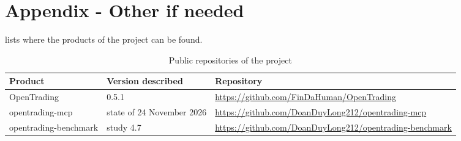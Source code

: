 \section{Appendix - Other if needed}\label{sec:app-other}
 lists where the products of the project can be found.

\begin{table}[H]
  \centering
  \caption{Public repositories of the project}\label{tab:repositories}
  \begin{tabularx}{\textwidth}{@{}l l L@{}}
    \toprule
    {Product} & {Version described} & {Repository}\\
    \midrule
    OpenTrading & 0.5.1 & \url{https://github.com/FinDaHuman/OpenTrading}\\
    opentrading-mcp & state of 24 November 2026 & \url{https://github.com/DoanDuyLong212/opentrading-mcp}\\
    opentrading-benchmark & study 4.7 & \url{https://github.com/DoanDuyLong212/opentrading-benchmark}\\
    \bottomrule
  \end{tabularx}
\end{table}
